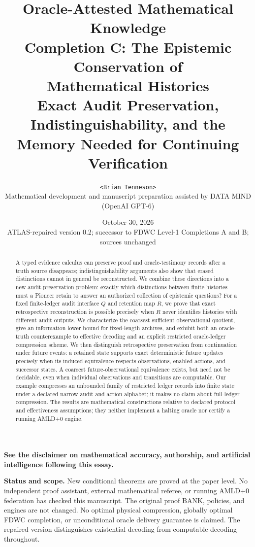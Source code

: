 \documentclass[11pt,letterpaper]{article}
\title{\bfseries Oracle-Attested Mathematical Knowledge\\[3pt]
\large Completion C: The Epistemic Conservation of\\ Mathematical Histories\\[3pt]
\normalsize Exact Audit Preservation, Indistinguishability, and the Memory Needed for Continuing Verification}
\author{\texttt{<Brian Tenneson>}\\\small Mathematical development and manuscript preparation assisted by DATA MIND (OpenAI GPT-6)}
\date{October 30, 2026\\\small ATLAS-repaired version 0.2; successor to FDWC Level-1 Completions A and B; sources unchanged}
\theoremstyle{definition}
\begin{document}
\maketitle
\begin{center}
\small\bfseries See the disclaimer on mathematical accuracy, authorship, and artificial intelligence following this essay.
\end{center}
\begin{abstract}
A typed evidence calculus can preserve proof and oracle-testimony records after a truth source disappears; indistinguishability arguments also show that erased distinctions cannot in general be reconstructed. We combine these directions into a new audit-preservation problem: exactly which distinctions between finite histories must a Pioneer retain to answer an authorized collection of epistemic questions? For a fixed finite-ledger audit interface $Q$ and retention map $R$, we prove that exact retrospective reconstruction is possible precisely when $R$ never identifies histories with different audit outputs. We characterize the coarsest sufficient observational quotient, give an information lower bound for fixed-length archives, and exhibit both an oracle-truth counterexample to effective decoding and an explicit restricted oracle-ledger compression scheme. We then distinguish retrospective preservation from continuation under future events: a retained state supports exact deterministic future updates precisely when its induced equivalence respects observations, enabled actions, and successor states. A coarsest future-observational equivalence exists, but need not be decidable, even when individual observations and transitions are computable. Our example compresses an unbounded family of restricted ledger records into finite state under a declared narrow audit and action alphabet; it makes no claim about full-ledger compression. The results are mathematical constructions relative to declared protocol and effectiveness assumptions; they neither implement a halting oracle nor certify a running AMLD+0 engine.
\end{abstract}
\noindent\textbf{Status and scope.} New conditional theorems are proved at the paper level. No independent proof assistant, external mathematical referee, or running AMLD+0 federation has checked this manuscript. The original proof BANK, policies, and engines are not changed. No optimal physical compression, globally optimal FDWC completion, or unconditional oracle delivery guarantee is claimed. The repaired version distinguishes existential decoding from computable decoding throughout.
\tableofcontents
\end{document}
